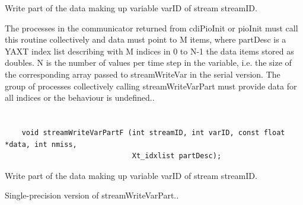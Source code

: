 Write part of the data making up variable varID
of stream streamID.

The processes in the communicator returned from cdiPioInit or
pioInit must call this routine collectively and data must point to
M items, where partDesc is a YAXT index list describing with M
indices in 0 to N-1 the data items stored as doubles. N is the
number of values per time step in the variable, i.e. the size of
the corresponding array passed to streamWriteVar in the serial version.
The group of processes collectively calling streamWriteVarPart
must provide data for all indices or the behaviour is undefined..


\section*{\tt {}}

\begin{verbatim}
    void streamWriteVarPartF (int streamID, int varID, const float *data, int nmiss,
                              Xt_idxlist partDesc);
\end{verbatim}

Write part of the data making up variable
varID of stream streamID.

Single-precision version of streamWriteVarPart..


